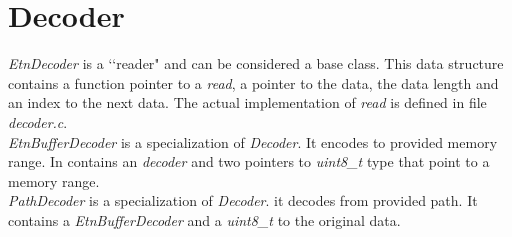 \section*{Decoder}
\emph{EtnDecoder} is a \lq\lq reader" and can be considered a base class. This data structure contains a function pointer to a \emph{read}, a pointer to the data, the data length and an index to the next data. The actual implementation of \emph{read} is defined in file \emph{decoder.c}.\\
\emph{EtnBufferDecoder} is a specialization of \emph{Decoder}. It encodes to provided memory range. In contains an \emph{decoder} and two pointers to \emph{uint8\_t} type that point to a memory range.\\
\emph{PathDecoder} is a specialization of \emph{Decoder}. 
it decodes from provided path. It contains a \emph{EtnBufferDecoder} and a \emph{uint8\_t} to the original data.
